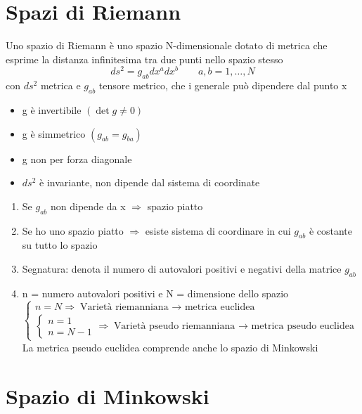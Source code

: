 \section{Spazi di Riemann}
Uno spazio di Riemann è uno spazio N-dimensionale dotato di metrica che esprime la distanza infinitesima tra due punti nello spazio stesso
\begin{equation*}
    ds^2 = g_{ab}dx^adx^b \qquad a,b = 1,\dots, N
\end{equation*}
con $ds^2$ metrica e $g_{ab}$ tensore metrico, che i generale può dipendere dal punto x
\begin{itemize}
    \item g è invertibile $(\det{g}\neq 0)$
    \item g è simmetrico $(g_{ab}=g_{ba})$
    \item g non per forza diagonale
    \item $ds^2$ è invariante, non dipende dal sistema di coordinate
\end{itemize}
\begin{enumerate}
    \item Se $g_{ab}$ non dipende da x $\Rightarrow$ spazio piatto
    \item Se ho uno spazio piatto $\Rightarrow$ esiste sistema di coordinare in cui $g_{ab}$ è costante su tutto lo spazio
    \item Segnatura: denota il numero di autovalori positivi e negativi della matrice $g_{ab}$
    \item n = numero autovalori positivi e N = dimensione dello spazio
    \begin{equation*}
        \begin{cases}
            n = N \Rightarrow \text{Varietà riemanniana $\rightarrow$ metrica euclidea} \\
            \begin{cases}
                n = 1 \\
                n = N-1 
            \end{cases}
            \Rightarrow \text{Varietà pseudo riemanniana $\rightarrow$ metrica pseudo euclidea}
        \end{cases}
    \end{equation*}
    La metrica pseudo euclidea comprende anche lo spazio di Minkowski
\end{enumerate}

\section{Spazio di Minkowski}
